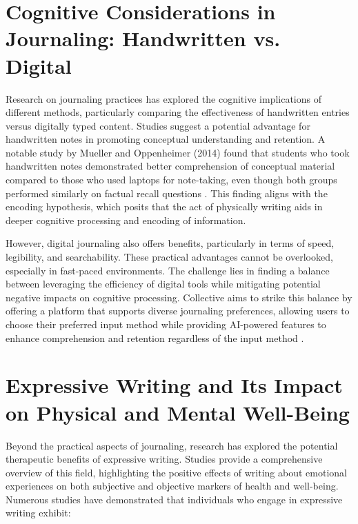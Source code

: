\section{Cognitive Considerations in Journaling: Handwritten vs. Digital}\label{sec:cognitive}

Research on journaling practices has explored the cognitive implications of different methods, particularly comparing the effectiveness of handwritten entries versus digitally typed content. Studies suggest a potential advantage for handwritten notes in promoting conceptual understanding and retention. A notable study by Mueller and Oppenheimer (2014) found that students who took handwritten notes demonstrated better comprehension of conceptual material compared to those who used laptops for note-taking, even though both groups performed similarly on factual recall questions \cite{mueller2014pen}. This finding aligns with the encoding hypothesis, which posits that the act of physically writing aids in deeper cognitive processing and encoding of information.

However, digital journaling also offers benefits, particularly in terms of speed, legibility, and searchability. These practical advantages cannot be overlooked, especially in fast-paced environments. The challenge lies in finding a balance between leveraging the efficiency of digital tools while mitigating potential negative impacts on cognitive processing. Collective aims to strike this balance by offering a platform that supports diverse journaling preferences, allowing users to choose their preferred input method while providing AI-powered features to enhance comprehension and retention regardless of the input method \cite{moore2015notetaking}.

\section{Expressive Writing and Its Impact on Physical and Mental Well-Being}\label{sec:expressive}

Beyond the practical aspects of journaling, research has explored the potential therapeutic benefits of expressive writing. Studies provide a comprehensive overview of this field, highlighting the positive effects of writing about emotional experiences on both subjective and objective markers of health and well-being. Numerous studies have demonstrated that individuals who engage in expressive writing exhibit:

